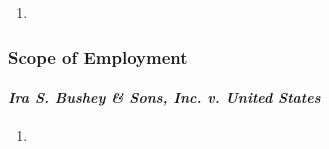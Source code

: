 \begin{enumerate}
    \item %
\end{enumerate}

\subsubsection{Scope of Employment}

\paragraph{\emph{Ira S. Bushey \& Sons, Inc. v. United States}}

\begin{enumerate}
    \item %
\end{enumerate}

